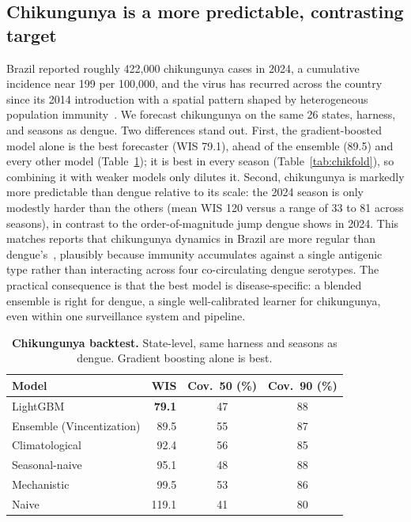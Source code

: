 \documentclass[11pt]{article}
\begin{document}
\subsection{Chikungunya is a more predictable, contrasting target}\label{sec:chik}
Brazil reported roughly 422{,}000 chikungunya cases in 2024, a cumulative incidence near 199 per
100{,}000, and the virus has recurred across the country since its 2014 introduction with a spatial
pattern shaped by heterogeneous population immunity~\citep{desouza2023}.
We forecast chikungunya on the same 26 states, harness, and seasons as dengue. Two differences stand
out. First, the gradient-boosted model alone is the best forecaster (WIS 79.1), ahead of the ensemble
(89.5) and every other model (Table~\ref{tab:chik}); it is best in every season
(Table~\ref{tab:chikfold}), so combining it with weaker models only dilutes it. Second, chikungunya is
markedly more predictable than dengue relative to its scale: the 2024 season is only modestly harder
than the others (mean WIS 120 versus a range of 33 to 81 across seasons), in contrast to the
order-of-magnitude jump dengue shows in 2024. This matches reports that chikungunya dynamics in Brazil
are more regular than dengue's~\citep{desouza2023}, plausibly because immunity accumulates
against a single antigenic type rather than interacting across four co-circulating dengue serotypes.
The practical consequence is that the best model is disease-specific: a blended ensemble is right for
dengue, a single well-calibrated learner for chikungunya, even within one surveillance system and
pipeline.

\begin{table}[t]
\centering\small
\caption{\textbf{Chikungunya backtest.} State-level, same harness and seasons as dengue. Gradient
boosting alone is best.}
\label{tab:chik}
\begin{tabular}{@{}lrcc@{}}
\toprule
\textbf{Model} & \textbf{WIS} & \textbf{Cov.\ 50 (\%)} & \textbf{Cov.\ 90 (\%)} \\
\midrule
LightGBM                  & \textbf{79.1} & 47 & 88 \\
Ensemble (Vincentization) & 89.5 & 55 & 87 \\
Climatological            & 92.4 & 56 & 85 \\
Seasonal-naive            & 95.1 & 48 & 88 \\
Mechanistic               & 99.5 & 53 & 86 \\
Naive                     & 119.1 & 41 & 80 \\
\bottomrule
\end{tabular}
\end{table}
\end{document}
